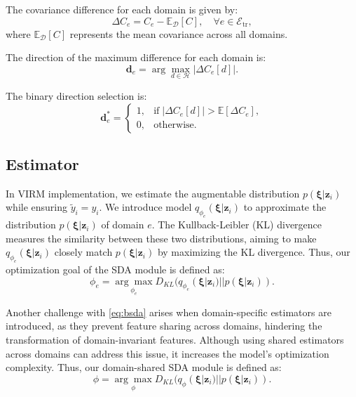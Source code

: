 The covariance difference for each domain is given by:
\begin{equation}
	\Delta C_e = C_e - \mathbb{E}_{\mathcal{D}}[C], \quad \forall e \in \mathcal{E}_{\mathrm{tr} },
\end{equation}
where $\mathbb{E}_{\mathcal{D}}[C]$ represents the mean covariance across all domains.

The direction of the maximum difference for each domain is:
\begin{equation}
	\mathbf{d}_e = \arg\max_{d \in \mathcal{H}} |\Delta C_e[d]|.
\end{equation}

The binary direction selection is:
\begin{equation}
	\mathbf{d}_{e}^* = 
	\begin{cases}
		1, & \text{if} \; |\Delta C_e[d]| > \mathbb{E}[\Delta C_e], \\
		0, & \text{otherwise.}
	\end{cases}
\end{equation}

\subsection{Estimator}
\label{sec:estimator}
In VIRM implementation, we estimate the augmentable distribution $p(\mathbf{\xi} |\mathbf{z}_i)$ while ensuring $\tilde{y}_i = y_i$. We introduce model $q_{\phi_e}(\mathbf{\xi}|\mathbf{\mathbf{z}}_i)$ to approximate the distribution $p(\mathbf{\xi} |\mathbf{z}_i)$ of domain $e$. The Kullback-Leibler (KL) divergence measures the similarity between these two distributions, aiming to make $q_{\phi_e}(\mathbf{\xi} |\mathbf{z}_i)$ closely match $p(\mathbf{\xi} |\mathbf{z}_i)$ by maximizing the KL divergence. Thus, our optimization goal of the SDA module is defined as:
\begin{equation}
	\label{eq:bsda}
	\phi_e = \underset{\phi_e}{\arg\max} D_{KL}(q_{\phi_e}(\mathbf{\xi}|\mathbf{\mathbf{z}}_i) || p(\mathbf{\xi}|\mathbf{\mathbf{z}}_i)).
\end{equation}

Another challenge with \cref{eq:bsda} arises when domain-specific estimators are introduced, as they prevent feature sharing across domains, hindering the transformation of domain-invariant features. Although using shared estimators across domains can address this issue, it increases the model's optimization complexity. Thus, our domain-shared SDA module is defined as:
\begin{equation}
	\label{eq:sdsda}
	\phi = \underset{\phi}{\arg\max} D_{KL}(q_{\phi}(\mathbf{\xi}|\mathbf{\mathbf{z}}_i) || p(\mathbf{\xi}|\mathbf{\mathbf{z}}_i)).
\end{equation}


